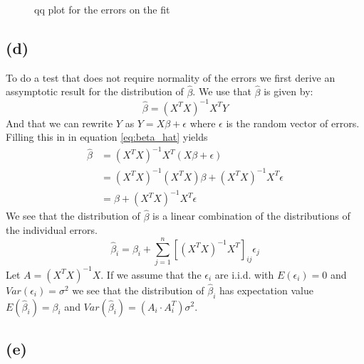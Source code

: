 \documentclass[a4paper]{article}
\begin{document}
\begin{figure}[h]
	\centering
	
	\caption{qq plot for the errors on the fit}
	\label{fig:qqplot-1c}
\end{figure}

\subsection*{(d)}
\noindent {}

To do a test that does not require normality of the errors we first derive an assymptotic result for the distribution of $\hat{\beta}$.
We use that $\hat{\beta}$ is given by:
\begin{equation}
	\hat{\beta} = (X^TX)^{-1} X^TY
	\label{eq:beta_hat}
\end{equation}
And that we can rewrite $Y$ as $Y=X\beta + \epsilon$ where $\epsilon$ is the random vector of errors. Filling this in in equation \ref{eq:beta_hat} yields
\begin{align*}
	\hat{\beta} &= (X^TX)^{-1} X^T (X\beta + \epsilon)\\
		    &= (X^TX)^{-1} (X^TX) \beta + (X^TX)^{-1}X^T\epsilon\\
		    &= \beta + (X^TX)^{-1}X^T\epsilon
\end{align*}
We see that the distribution of $\hat{\beta}$ is a linear combination of the distributions of the individual errors.
\begin{equation}
	\hat{\beta}_i = \beta_i + \sum_{j=1}^{n}[(X^TX)^{-1}X^T]_{ij} \epsilon_j
\end{equation}
Let $A = (X^TX)^{-1}X$. If we assume that the $\epsilon_i$ are i.i.d. with $E(\epsilon_i)=0$ and $Var(\epsilon_i)=\sigma^2$ we see that the distribution of $\hat{\beta}_i$ has expectation value $E(\hat{\beta}_i)=\beta_i$ and $Var(\hat{\beta}_i) = (A_i \cdot A_i^T) \sigma^2$. 

\subsection*{(e)}
\noindent {}
\end{document}
